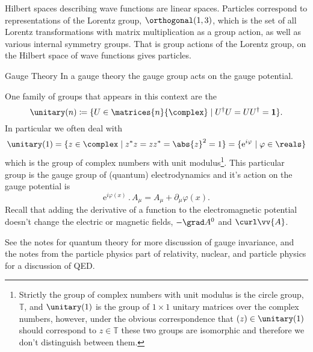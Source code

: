 \documentclass[fleqn]{NotesClass}
\newcommand*{\action}{\mathbin{.}}
\newcommand*{\hermit}{\dagger}
\newcommand*{\ident}{\mathbf{1}}
\newcommand*{\e}{\mathrm{e}}
\begin{document}
    \begin{app}{}{}
        Hilbert spaces describing wave functions are linear spaces.
        Particles correspond to representations of the Lorentz group, \(\orthogonal(1, 3)\), which is the set of all Lorentz transformations with matrix multiplication as a group action, as well as various internal symmetry groups.
        That is group actions of the Lorentz group, on the Hilbert space of wave functions gives particles.
    \end{app}
    
    \begin{app}{Gauge Theory}{}
        In a gauge theory the gauge group acts on the gauge potential.
        
        One family of groups that appears in this context are the 
        \begin{equation}
            \unitary(n) \coloneqq \{ U \in \matrices{n}{\complex} \mid U^\hermit U = UU^\hermit = \ident \}.
        \end{equation}
        In particular we often deal with
        \begin{equation}
            \unitary(1) = \{z \in \complex \mid z^*z = zz^* = \abs{z}^2 = 1 \} = \{\e^{i\varphi} \mid \varphi \in \reals \}
        \end{equation}
        which is the group of complex numbers with unit modulus\footnote{Strictly the group of complex numbers with unit modulus is the circle group, \(\mathbb{T}\), and \(\unitary(1)\) is the group of \(1\times 1\) unitary matrices over the complex numbers, however, under the obvious correspondence that \((z) \in \unitary(1)\) should correspond to \(z \in \mathbb{T}\) these two groups are isomorphic and therefore we don't distinguish between them.}.
        This particular group is the gauge group of (quantum) electrodynamics and it's action on the gauge potential is
        \begin{equation}
            \e^{i\varphi(x)} \action A_\mu = A_\mu + \partial_\mu \varphi(x).
        \end{equation}
        Recall that adding the derivative of a function to the electromagnetic potential doesn't change the electric or magnetic fields, \(-\grad A^0\) and \(\curl \vv{A}\).
        
        \begin{rmk}
            See the notes for quantum theory for more discussion of gauge invariance, and the notes from the particle physics part of relativity, nuclear, and particle physics for a discussion of QED.
        \end{rmk}
    \end{app}
    
\end{document}
